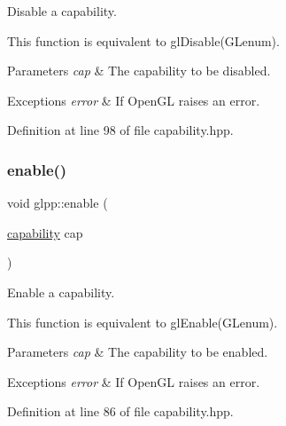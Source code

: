 Disable a capability. 

This function is equivalent to gl\+Disable(\+G\+Lenum).


\begin{DoxyParams}{Parameters}
{\em cap} & The capability to be disabled. \\
\hline
\end{DoxyParams}

\begin{DoxyExceptions}{Exceptions}
{\em error} & If Open\+GL raises an error. \\
\hline
\end{DoxyExceptions}


Definition at line 98 of file capability.\+hpp.

\mbox{\label{namespaceglpp_ad1970949b2ced11cdacaf1c8b54ef0c3}} 
\subsubsection{\texorpdfstring{enable()}{enable()}}
{\footnotesize\ttfamily void glpp\+::enable (\begin{DoxyParamCaption}\item[{\hyperlink{namespaceglpp_a1b0f7d2f17d11ae11a12d44571612832}{capability}}]{cap }\end{DoxyParamCaption})\hspace{0.3cm}{\ttfamily [inline]}}



Enable a capability. 

This function is equivalent to gl\+Enable(\+G\+Lenum).


\begin{DoxyParams}{Parameters}
{\em cap} & The capability to be enabled. \\
\hline
\end{DoxyParams}

\begin{DoxyExceptions}{Exceptions}
{\em error} & If Open\+GL raises an error. \\
\hline
\end{DoxyExceptions}


Definition at line 86 of file capability.\+hpp.

\mbox{\label{namespaceglpp_a2a2a3cd8cd810b4e2f45173037cd60b9}} 
